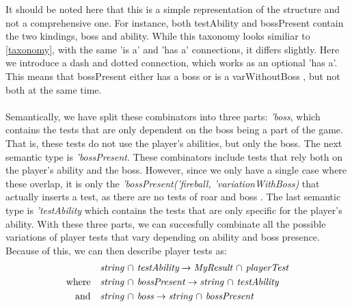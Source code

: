 It should be noted here that this is a simple representation of the structure and not a comprehensive one. For instance, both testAbility and bossPresent contain the two kindings, boss and ability. While this taxonomy looks similiar to \autoref{taxonomy}, with the same 'is a' and 'has a' connections, it differs slightly. Here we introduce a dash and dotted connection, which works as an optional 'has a'. This means that bossPresent either has a boss or is a varWithoutBoss , but not both at the same time. \\
\\ 
Semantically, we have split these combinators into three parts: \textit{'boss}, which contains the tests that are only dependent on the boss being a part of the game. That is, these tests do not use the player's abilities, but only the boss. The next semantic type is \textit{'bossPresent}. These combinators include tests that rely both on the player's ability and the boss. However, since we only have a single case where these overlap, it is only the \textit{'bossPresent('fireball, 'variationWithBoss)} that actually inserts a test, as there are no tests of roar and boss . The last semantic type is \textit{'testAbility} which contains the tests that are only specific for the player's ability. With these three parts, we can succesfully combinate all the possible variations of player tests that vary depending on ability and boss presence. Because of this, we can then describe player tests as: 
\begin{align*}
	&\textit{string $\cap$ testAbility} \to \textit{MyResult $\cap$ playerTest} \\
	\text{where\quad} &\textit{string $\cap$ bossPresent} \to \textit{string $\cap$ testAbility} \\
	\text{and\quad} &\textit{string $\cap$ boss} \to \textit{string $\cap$ bossPresent}
\end{align*}
